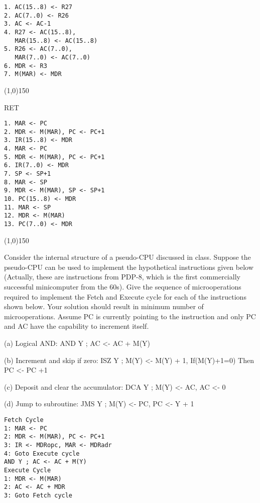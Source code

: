 \documentclass[8pt]{article}
\begin{document}
\begin{multicols}{3}
\begin{verbatim}
1. AC(15..8) <- R27
2. AC(7..0) <- R26
3. AC <- AC-1
4. R27 <- AC(15..8), 
   MAR(15..8) <- AC(15..8)
5. R26 <- AC(7..0), 
   MAR(7..0) <- AC(7..0)
6. MDR <- R3
7. M(MAR) <- MDR
\end{verbatim}

\line(1,0){150}

RET

\begin{verbatim}
1. MAR <- PC
2. MDR <- M(MAR), PC <- PC+1
3. IR(15..8) <- MDR
4. MAR <- PC
5. MDR <- M(MAR), PC <- PC+1
6. IR(7..0) <- MDR
7. SP <- SP+1
8. MAR <- SP
9. MDR <- M(MAR), SP <- SP+1
10. PC(15..8) <- MDR
11. MAR <- SP
12. MDR <- M(MAR)
13. PC(7..0) <- MDR
\end{verbatim}

\line(1,0){150}

Consider the internal structure of a pseudo-CPU discussed in class. Suppose
the pseudo-CPU can be used to implement the hypothetical instructions given
below (Actually, these are instructions from PDP-8, which is the first
commercially successful minicomputer from the 60s). Give the sequence of
microoperations required to implement the Fetch and Execute cycle for each of
the instructions shown below. Your solution should result in minimum number of
microoperations. Assume PC is currently pointing to the instruction and only
PC and AC have the capability to increment itself.

(a) Logical AND: AND Y ; AC <- AC + M(Y)

(b) Increment and skip if zero: 
ISZ Y ; M(Y) <- M(Y) + 1, If(M(Y)+1=0) Then PC <- PC +1

(c) Deposit and clear the accumulator: DCA
Y ; M(Y) <- AC, AC <- 0

(d) Jump to subroutine: JMS Y ; M(Y) <- PC, PC <- Y + 1

\begin{verbatim}
Fetch Cycle
1: MAR <- PC
2: MDR <- M(MAR), PC <- PC+1
3: IR <- MDRopc, MAR <- MDRadr
4: Goto Execute cycle
AND Y ; AC <- AC + M(Y)
Execute Cycle
1: MDR <- M(MAR)
2: AC <- AC + MDR
3: Goto Fetch cycle
\end{verbatim}



\end{multicols}
\end{document}
